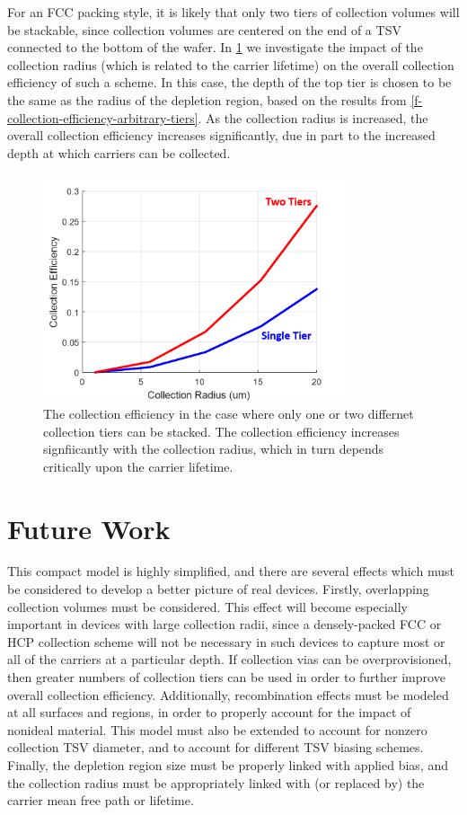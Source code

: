 \documentclass[journal,twoside]{IEEEtran}
\begin{document}
For an FCC packing style, it is likely that only two tiers of collection
volumes will be stackable, since collection volumes are centered on the end of a TSV connected to the bottom of the wafer.
In \cref{f-collection-efficiency-vs-radius} we investigate the impact of the collection radius (which is related to the
carrier lifetime) on the overall collection efficiency of such a scheme. In this case, the depth of the top tier is chosen
to be the same as the radius of the depletion region, based on the results from \cref{f-collection-efficiency-arbitrary-tiers}.
As the collection radius is increased, the overall collection efficiency increases significantly, due in part to the increased
depth at which carriers can be collected.

\begin{figure}[tb]
	\centering
	\includegraphics[width=3.5in]{figures/efficiency_vs_collection_radius.png}
	\caption{	The collection efficiency in the case where only one or two differnet collection tiers can be stacked.
				The collection efficiency increases signfiicantly with the collection radius, which in turn depends
				critically upon the carrier lifetime.
			}
	\label{f-collection-efficiency-vs-radius}
\end{figure}

\section{Future Work}
This compact model is highly simplified, and there are several effects which must be considered to develop a better picture of real
devices. Firstly, overlapping collection volumes must be considered. This effect will become especially important in devices
with large collection radii, since a densely-packed FCC or HCP collection scheme will not be necessary in such devices to capture
most or all of the carriers at a particular depth. If collection vias can be overprovisioned, then greater numbers of collection tiers
can be used in order to further improve overall collection efficiency. Additionally, recombination effects must be modeled at all surfaces and regions, in order to properly account for the impact of
nonideal material. This model must also be extended to account for nonzero collection TSV diameter, and to account for different TSV biasing schemes.
Finally, the depletion region size must be properly linked with applied bias, and the collection radius must be appropriately linked with (or replaced by)
the carrier mean free path or lifetime.
\end{document}
